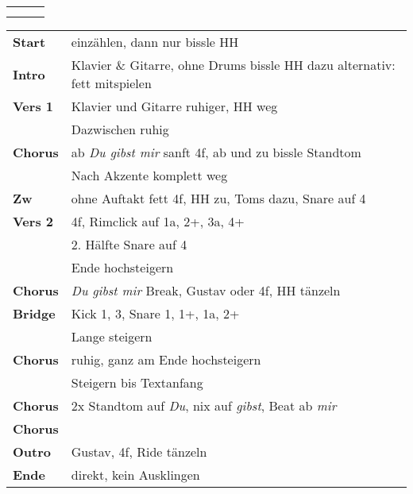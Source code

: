 

\begin{tabular}{p{0.6cm}p{12cm}p{1.4cm}}
	\rowcolor{cyan} \myRow{\thesongnumber} & \myRow{Neues Leben} & \myRow{157} \\
	                                       &                     &             \\
\end{tabular}

\begin{tabular}{p{1.6cm}l}
	\textbf{Start}  & einzählen, dann nur bissle HH                                             \\
	\textbf{Intro}  & Klavier \& Gitarre, ohne Drums bissle HH dazu alternativ: fett mitspielen \\
	\textbf{Vers 1} & Klavier und Gitarre ruhiger, HH weg                                       \\
	                & Dazwischen ruhig                                                          \\
	\textbf{Chorus} & ab \textit{Du gibst mir} sanft 4f, ab und zu bissle Standtom              \\
	                & Nach Akzente komplett weg                                                 \\
	\textbf{Zw}     & ohne Auftakt fett 4f, HH zu, Toms dazu, Snare auf 4                       \\
	\textbf{Vers 2} & 4f, Rimclick auf 1a, 2+, 3a, 4+                                           \\
	                & 2. Hälfte Snare auf 4                                                     \\
	                & Ende hochsteigern                                                         \\
	\textbf{Chorus} & \textit{Du gibst mir} Break, Gustav oder 4f, HH tänzeln                   \\
	\textbf{Bridge} & Kick 1, 3, Snare 1, 1+, 1a, 2+                                            \\
	                & Lange steigern                                                            \\
	\textbf{Chorus} & ruhig, ganz am Ende hochsteigern                                          \\
	                & Steigern bis Textanfang                                                   \\
	\textbf{Chorus} & 2x Standtom auf \textit{Du}, nix auf \textit{gibst}, Beat ab \textit{mir} \\
	\textbf{Chorus} &                                                                           \\
	\textbf{Outro}  & Gustav, 4f, Ride tänzeln                                                  \\
	\textbf{Ende}   & direkt, kein Ausklingen                                                   \\
\end{tabular}

